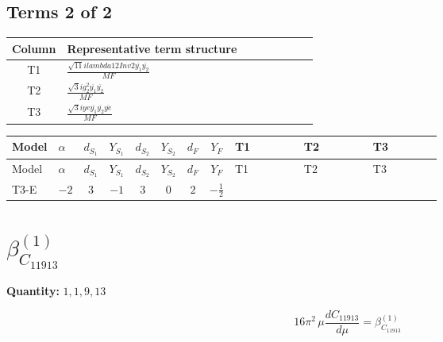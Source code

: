 \documentclass[8pt]{article}
\begin{document}
\begin{landscape}
\subsection*{Terms 2 of 2}
\begin{center}
\begin{tabular}{@{}c >{\raggedright\arraybackslash}p{0.82\linewidth}@{}}
\toprule
Column & Representative term structure \\
\midrule
T1 & \(\displaystyle \frac{\sqrt{11} i lambda12Inv2 \overline{y_{1}} \overline{y_{2}}}{MF}\) \\
\midrule
T2 & \(\displaystyle \frac{\sqrt{3} i g_{2}^{2} \overline{y_{1}} \overline{y_{2}}}{MF}\) \\
\midrule
T3 & \(\displaystyle \frac{\sqrt{3} i ye \overline{y_{1}} \overline{y_{2}} \overline{ye}}{MF}\) \\
\midrule
\bottomrule
\end{tabular}
\end{center}
\smallskip
\tiny
\begin{longtable}{@{}llcccccc >{\raggedright\arraybackslash}p{0.21\linewidth} >{\raggedright\arraybackslash}p{0.21\linewidth} >{\raggedright\arraybackslash}p{0.21\linewidth}@{}}
\toprule
Model & $\alpha$ & $d_{S_1}$ & $Y_{S_1}$ & $d_{S_2}$ & $Y_{S_2}$ & $d_F$ & $Y_F$ & T1 & T2 & T3 \\
\midrule
\endfirsthead
\toprule
Model & $\alpha$ & $d_{S_1}$ & $Y_{S_1}$ & $d_{S_2}$ & $Y_{S_2}$ & $d_F$ & $Y_F$ & T1 & T2 & T3 \\
\midrule
\endhead
T3-E & $-2$ & $3$ & $-1$ & $3$ & $0$ & $2$ & $-\frac{1}{2}$ & \scriptsize\adjustbox{max width=\linewidth}{$\begin{gathered} \frac{3 \sqrt{11} i lambda12Inv2 \overline{y_{1}} \overline{y_{2}}}{22 MF}\end{gathered}$} & \scriptsize\adjustbox{max width=\linewidth}{$\begin{gathered} \frac{11 \sqrt{3} i g_{2}^{2} \overline{y_{1}} \overline{y_{2}}}{8 MF}\end{gathered}$} & \scriptsize\adjustbox{max width=\linewidth}{$\begin{gathered} - \frac{\sqrt{3} i ye \overline{y_{1}} \overline{y_{2}} \overline{ye}}{12 MF}\end{gathered}$} \\
\midrule
\bottomrule
\end{longtable}
\clearpage
\section*{$\beta_{C_{11913}}^{(1)}$}
\noindent\textbf{Quantity: }$\mathrm{1,1,9,13}$\par\smallskip
\[16\pi^2\,\mu\frac{d C_{11913}}{d\mu}=\beta_{C_{11913}}^{(1)}\]

\end{landscape}
\end{document}
